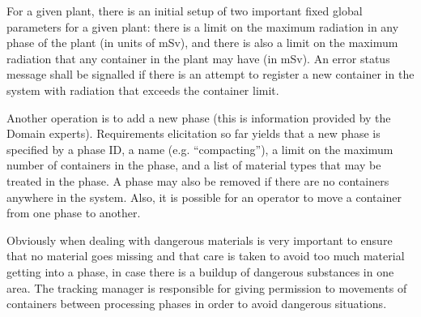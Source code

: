 \documentclass[fontsize=12pt,paper=letter,twoside]{scrartcl}
\begin{document}
For a given plant, there is an initial setup of two important fixed global parameters for a given plant: there is a limit on the maximum radiation in any phase of the plant (in units of mSv), and there is also a limit on the maximum radiation that any container in the plant may have (in mSv). An error status message shall be signalled if there is an attempt to register a new container in the system with radiation that exceeds the container limit.

Another operation is to add a new phase (this is information provided by the Domain experts). Requirements elicitation so far yields that a new phase is specified by a phase ID, a name (e.g. “compacting”), a limit on the maximum number of containers in the phase, and a list of material types that may be treated in the phase. A phase may also be removed if there are no containers anywhere in the system. Also, it is possible for an operator to move a container from one phase to another.

Obviously when dealing with dangerous materials is very important to ensure that no material goes missing and that care is taken to avoid too much material getting into a phase, in case there is a buildup of dangerous substances in one area. The tracking manager is responsible for giving permission to movements of containers between processing phases in order to avoid dangerous situations.

\newpage
\end{document}
